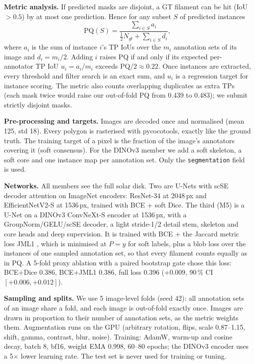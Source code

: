 \documentclass[sigconf]{acmart}
\begin{document}
\textbf{Metric analysis.} If predicted masks are disjoint, a GT filament can be hit (IoU $>0.5$) by at most one prediction. Hence for any subset $S$ of predicted instances
\begin{equation}
\mathrm{PQ}(S)=\frac{\sum_{i\in S} a_i}{\tfrac12 N_{gt}+\sum_{i\in S} d_i},
\end{equation}
where $a_i$ is the sum of instance $i$'s TP IoUs over the $m_i$ annotation sets of its image and $d_i=m_i/2$. Adding $i$ raises PQ if and only if its expected per-annotator TP IoU $u_i=a_i/m_i$ exceeds PQ$/2\approx0.22$. Once instances are extracted, every threshold and filter search is an exact sum, and $u_i$ is a regression target for instance scoring. The metric also counts overlapping duplicates as extra TPs (each mask twice would raise our out-of-fold PQ from 0.439 to 0.483); we submit strictly disjoint masks.

\textbf{Pre-processing and targets.} Images are decoded once and normalised (mean 125, std 18). Every polygon is rasterised with pycocotools, exactly like the ground truth. The training target of a pixel is the fraction of the image's annotators covering it (soft consensus). For the DINOv3 member we add a soft skeleton, a soft core and one instance map per annotation set. Only the \texttt{segmentation} field is used.

\textbf{Networks.} All members see the full solar disk. Two are U-Nets \cite{ronneberger2015unet} with scSE decoder attention \cite{roy2018scse} on ImageNet encoders: ResNet-34 \cite{he2016resnet} at 2048\,px and EfficientNetV2-S \cite{tan2021efficientnetv2} at 1536\,px, trained with BCE + soft Dice. The third (M5) is a U-Net on a DINOv3 \cite{dinov3} ConvNeXt-S \cite{liu2022convnext} encoder at 1536\,px, with a GroupNorm/GELU/scSE decoder, a light stride-1/2 detail stem, skeleton and core heads and deep supervision. It is trained with BCE + the Jaccard metric loss JML1 \cite{wang2023jml}, which is minimised at $P=y$ for soft labels, plus a blob loss \cite{kofler2023blob} over the instances of one sampled annotation set, so that every filament counts equally as in PQ. A 5-fold proxy ablation with a paired bootstrap gate chose this loss: BCE+Dice 0.386, BCE+JML1 0.386, full loss 0.396 ($+0.009$, 90\,\% CI $[+0.006,+0.012]$).

\textbf{Sampling and splits.} We use 5 image-level folds (seed 42): all annotation sets of an image share a fold, and each image is out-of-fold exactly once. Images are drawn in proportion to their number of annotation sets, as the metric weights them. Augmentation runs on the GPU (arbitrary rotation, flips, scale 0.87--1.15, shift, gamma, contrast, blur, noise). Training: AdamW, warm-up and cosine decay, batch 8, bf16, weight EMA 0.998, 60--80 epochs; the DINOv3 encoder uses a 5$\times$ lower learning rate. The test set is never used for training or tuning.
\end{document}
